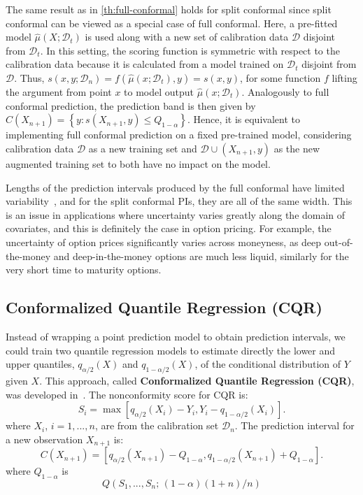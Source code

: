 \documentclass{article}
\theoremstyle{definition}
\begin{document}
The same result as in \ref{th:full-conformal} holds for split conformal since split conformal can be viewed as a special case of full conformal. Here, a pre-fitted model $\hat{\mu}(X; \mathcal{D}_t)$ is used along with a new set of calibration data $\mathcal{D}$ disjoint from $\mathcal{D}_t$. In this setting, the scoring function is symmetric with respect to the calibration data because it is calculated from a model trained on $\mathcal{D}_t$ disjoint from $\mathcal{D}$. Thus, $s(x, y; \mathcal{D}_n) = f(\hat{\mu}(x; \mathcal{D}_t), y) = s(x, y)$, for some function $f$ lifting the argument from point $x$ to model output $\hat{\mu}(x; \mathcal{D}_t)$. Analogously to full conformal prediction, the prediction band is then given by $\hat{C}(X_{n+1}) = \left\{y : s(X_{n+1}, y) \le Q_{1-\alpha}\right\}$. Hence, it is equivalent to implementing full conformal prediction on a fixed pre-trained model, considering calibration data $\mathcal{D}$ as a new training set and $\mathcal{D} \cup (X_{n+1}, y)$ as the new augmented training set to both have no impact on the model.

Lengths of the prediction intervals produced by the full conformal have limited variability~\cite{Lei2016DistributionFreePI}, and for the split conformal PIs, they are all of the same width. This is an issue in applications where uncertainty varies greatly along the domain of covariates, and this is definitely the case in option pricing. For example, the uncertainty of option prices significantly varies across moneyness, as deep out-of-the-money and deep-in-the-money options are much less liquid, similarly for the very short time to maturity options.


\subsection{Conformalized Quantile Regression (CQR)}\label{subsec:cqr}

Instead of wrapping a point prediction model to obtain prediction intervals, we could train two quantile regression models to estimate directly the lower and upper quantiles, $q_{\alpha/2}(X)$ and $q_{1-\alpha/2}(X)$, of the conditional distribution of $Y$ given $X$. This approach, called \textbf{Conformalized Quantile Regression (CQR)}, was developed in~\cite{cqr}. The nonconformity score for CQR is:
\begin{equation} \label{eq:cqr_nonconformity}
    S_i = \max\left[q_{\alpha/2}(X_i) - Y_i, Y_i - q_{1-\alpha/2}(X_i)\right].
\end{equation}
where $X_i$, $i=1, ..., n$, are from the calibration set $\mathcal{D}_n$. The prediction interval for a new observation $X_{n+1}$ is:
\begin{equation} \label{eq:cqr_interval}
    C(X_{n+1}) = \left[q_{\alpha/2}(X_{n+1}) - Q_{1-\alpha}, q_{1-\alpha/2}(X_{n+1}) + Q_{1-\alpha}\right].
\end{equation}
where $Q_{1-\alpha}$ is
\begin{equation}
    Q\left(S_1, ..., S_n;\, (1-\alpha)(1+n)/n\right)
\end{equation}
\end{document}
